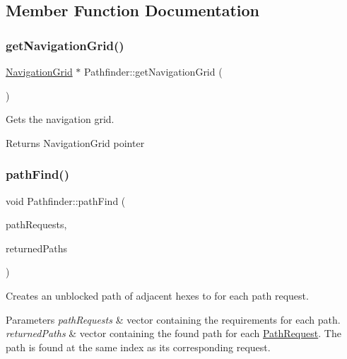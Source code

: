 \subsection{Member Function Documentation}
\mbox{\label{class_pathfinder_ab8d678b30e172c242923fb55f0a7a028}} 
\subsubsection{\texorpdfstring{get\+Navigation\+Grid()}{getNavigationGrid()}}
{\footnotesize\ttfamily \hyperlink{class_array3_d}{Navigation\+Grid} $\ast$ Pathfinder\+::get\+Navigation\+Grid (\begin{DoxyParamCaption}{ }\end{DoxyParamCaption})}



Gets the navigation grid. 

\begin{DoxyReturn}{Returns}
Navigation\+Grid pointer
\end{DoxyReturn}
\mbox{\label{class_pathfinder_ab92e595aab257245d23dc19ff68f04fa}} 
\subsubsection{\texorpdfstring{path\+Find()}{pathFind()}}
{\footnotesize\ttfamily void Pathfinder\+::path\+Find (\begin{DoxyParamCaption}\item[{const std\+::vector$<$ \hyperlink{struct_path_request}{Path\+Request} $>$ \&}]{path\+Requests,  }\item[{std\+::vector$<$ std\+::list$<$ sf\+::\+Vector3i $>$$>$ $\ast$const}]{returned\+Paths }\end{DoxyParamCaption})}



Creates an unblocked path of adjacent hexes to for each path request. 


\begin{DoxyParams}{Parameters}
{\em path\+Requests} & vector containing the requirements for each path.\\
\hline
{\em returned\+Paths} & vector containing the found path for each \hyperlink{struct_path_request}{Path\+Request}. The path is found at the same index as its corresponding request.\\
\hline
\end{DoxyParams}
\mbox{\label{class_pathfinder_ab2077e60f522a2d422f8b0e63cc4aa40}} 
